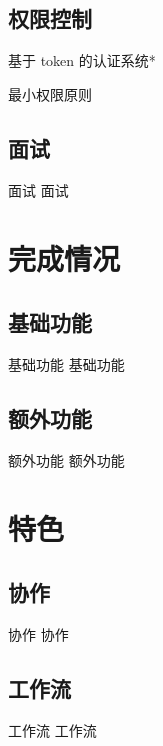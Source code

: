 \documentclass[aspectratio=169,10pt]{beamer}
\begin{document}
\subsection{权限控制}
\begin{frame}{基于 token 的认证系统*}

\end{frame}

\begin{frame}{最小权限原则}

\end{frame}

\subsection{面试}
\begin{frame}{面试}
  面试
\end{frame}

\section{完成情况}

\subsection{基础功能}
\begin{frame}{基础功能}
  基础功能
\end{frame}

\subsection{额外功能}
\begin{frame}{额外功能}
  额外功能
\end{frame}

\section{特色}
\subsection{协作}
\begin{frame}{协作}
  协作
\end{frame}

\subsection{工作流}
\begin{frame}{工作流}
  工作流
\end{frame}
\end{document}

